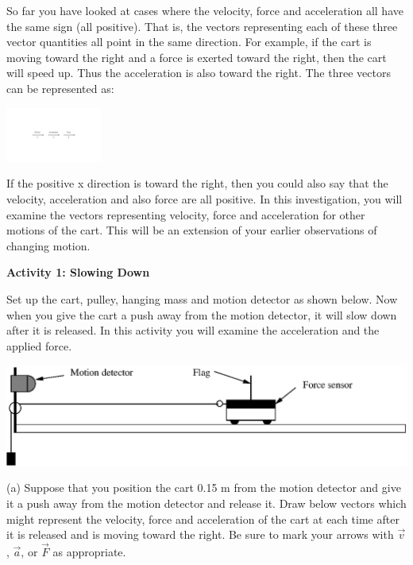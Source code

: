 So far you have looked at cases where the velocity, force and acceleration all
have the same sign (all positive). That is, the vectors representing each of
these three vector quantities all point in the same direction. For example,
if the cart is moving toward the right and a force is exerted toward the right,
then the cart will speed up. Thus the acceleration is also toward the right.
The three vectors can be represented as:

\vspace{0.3cm}
{\par\centering \includegraphics[height=0.7in]{force2/force2_fig1_new.pdf} \par}
\vspace{0.3cm}

If the positive x direction is toward the right, then you could also say that
the velocity, acceleration and also force are all positive. In this investigation,
you will examine the vectors representing velocity, force and acceleration for
other motions of the cart. This will be an extension of your earlier observations
of changing motion.

\textbf{Activity 1: Slowing Down} 

Set up the cart, pulley, hanging mass and motion detector as shown below. Now
when you give the cart a push away from the motion detector, it will slow down
after it is released. In this activity you will examine the acceleration and
the applied force.

\vspace{0.3cm}
{\par\centering \includegraphics{force2/force2_fig2.eps} \par}
\vspace{0.3cm}

(a) Suppose that you position the cart 0.15 m from the motion detector and give
it a push away from the motion detector and release it. Draw below vectors which
might represent the velocity, force and acceleration of the cart at each time
after it is released and is moving toward the right. Be sure to mark your arrows
with \( {\vec v} \), \( {\vec a} \), or \( {\vec F} \)
as appropriate.

